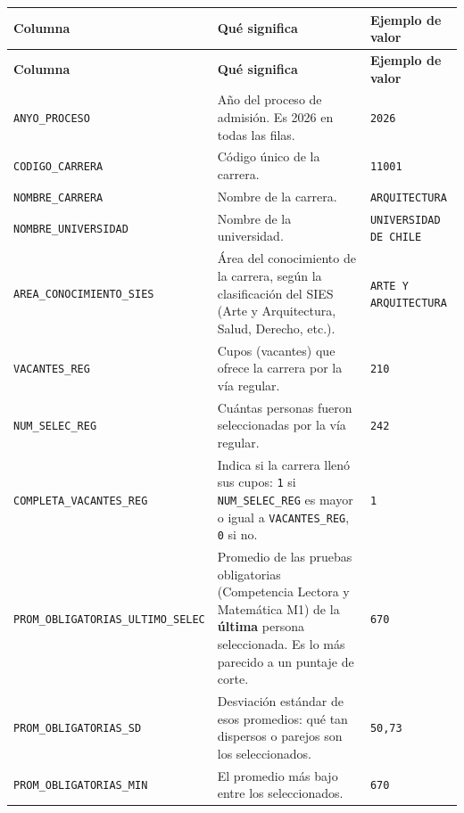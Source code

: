 \documentclass[10.5pt]{article}
\newcommand{\hdr}[1]{\textbf{\color{white}#1}}
\begin{document}
\begin{xltabular}{\linewidth}{@{}p{4.5cm} >{\raggedright\arraybackslash}X p{3.4cm}@{}}
\hdr{Columna} & \hdr{Qué significa} & \hdr{Ejemplo de valor} \\
\endfirsthead
{}\hdr{Columna} & \hdr{Qué significa} & \hdr{Ejemplo de valor} \\
\endhead
\texttt{ANYO\_\allowbreak{}PROCESO} & Año del proceso de admisión. Es 2026 en todas las filas. & \texttt{2026} \\
\texttt{CODIGO\_\allowbreak{}CARRERA} & Código único de la carrera. & \texttt{11001} \\
\texttt{NOMBRE\_\allowbreak{}CARRERA} & Nombre de la carrera. & \texttt{ARQUITECTURA} \\
\texttt{NOMBRE\_\allowbreak{}UNIVERSIDAD} & Nombre de la universidad. & \texttt{UNIVERSIDAD DE CHILE} \\
\texttt{AREA\_\allowbreak{}CONOCIMIENTO\_\allowbreak{}SIES} & Área del conocimiento de la carrera, según la clasificación del SIES (Arte y Arquitectura, Salud, Derecho, etc.). & \texttt{ARTE Y ARQUITECTURA} \\
\texttt{VACANTES\_\allowbreak{}REG} & Cupos (vacantes) que ofrece la carrera por la vía regular. & \texttt{210} \\
\texttt{NUM\_\allowbreak{}SELEC\_\allowbreak{}REG} & Cuántas personas fueron seleccionadas por la vía regular. & \texttt{242} \\
\texttt{COMPLETA\_\allowbreak{}VACANTES\_\allowbreak{}REG} & Indica si la carrera llenó sus cupos: \texttt{1} si \texttt{NUM\_\allowbreak{}SELEC\_\allowbreak{}REG} es mayor o igual a \texttt{VACANTES\_\allowbreak{}REG}, \texttt{0} si no. & \texttt{1} \\
\texttt{PROM\_\allowbreak{}OBLIGATORIAS\_\allowbreak{}ULTIMO\_\allowbreak{}SELEC} & Promedio de las pruebas obligatorias (Competencia Lectora y Matemática M1) de la \textbf{última} persona seleccionada. Es lo más parecido a un puntaje de corte. & \texttt{670} \\
\texttt{PROM\_\allowbreak{}OBLIGATORIAS\_\allowbreak{}SD} & Desviación estándar de esos promedios: qué tan dispersos o parejos son los seleccionados. & \texttt{50,73} \\
\texttt{PROM\_\allowbreak{}OBLIGATORIAS\_\allowbreak{}MIN} & El promedio más bajo entre los seleccionados. & \texttt{670} \\

\end{xltabular}
\end{document}
